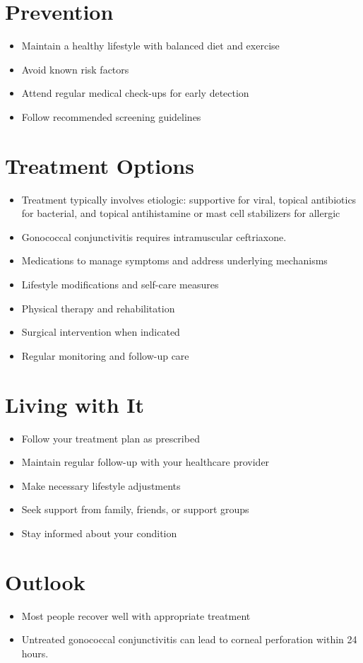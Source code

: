 \section{Prevention}
\begin{itemize}[noitemsep]
  \item Maintain a healthy lifestyle with balanced diet and exercise
  \item Avoid known risk factors
  \item Attend regular medical check-ups for early detection
  \item Follow recommended screening guidelines
\end{itemize}
\section{Treatment Options}
\begin{itemize}[noitemsep]
  \item Treatment typically involves etiologic: supportive for viral, topical antibiotics for bacterial, and topical antihistamine or mast cell stabilizers for allergic
  \item Gonococcal conjunctivitis requires intramuscular ceftriaxone.
  \item Medications to manage symptoms and address underlying mechanisms
  \item Lifestyle modifications and self-care measures
  \item Physical therapy and rehabilitation
  \item Surgical intervention when indicated
  \item Regular monitoring and follow-up care
\end{itemize}
\section{Living with It}
\begin{itemize}[noitemsep]
  \item Follow your treatment plan as prescribed
  \item Maintain regular follow-up with your healthcare provider
  \item Make necessary lifestyle adjustments
  \item Seek support from family, friends, or support groups
  \item Stay informed about your condition
\end{itemize}
\section{Outlook}
\begin{itemize}[noitemsep]
  \item Most people recover well with appropriate treatment
  \item Untreated gonococcal conjunctivitis can lead to corneal perforation within 24 hours.
\end{itemize}
